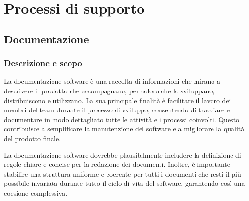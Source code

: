 \section{Processi di supporto}
\subsection{Documentazione}

\subsubsection{Descrizione e scopo} %

La documentazione software è una raccolta di informazioni che mirano a descrivere il prodotto che accompagnano, per coloro che lo sviluppano, distribuiscono e utilizzano. La sua principale finalità è facilitare il lavoro dei membri del team durante il processo di sviluppo, consentendo di tracciare e documentare in modo dettagliato tutte le attività e i processi coinvolti. Questo contribuisce a semplificare la manutenzione del software e a migliorare la qualità del prodotto finale.

La documentazione software dovrebbe plausibilmente includere la definizione di regole chiare e concise per la redazione dei documenti. Inoltre, è importante stabilire una struttura uniforme e coerente per tutti i documenti che resti il più possibile invariata durante tutto il ciclo di vita del software, garantendo così una coesione complessiva.

